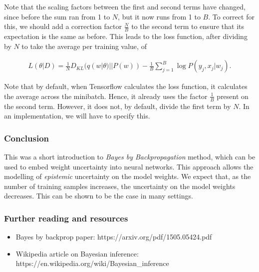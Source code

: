 \documentclass[11pt]{article}
\providecommand{\tightlist}{%
      \setlength{\itemsep}{0pt}\setlength{\parskip}{0pt}}
\begin{document}
Note that the scaling factors between the first and second terms have
changed, since before the sum ran from 1 to \(N\), but it now runs from
1 to \(B\). To correct for this, we should add a correction factor
\(\frac{N}{B}\) to the second term to ensure that its expectation is the
same as before. This leads to the loss function, after dividing by \(N\)
to take the average per training value, of

\[
\begin{align}
L(\theta | D) = \frac{1}{N} D_{KL} ( q(w | \theta) || P(w) ) - \frac{1}{B} \sum_{j=1}^{B} \log P(y_j, x_j | w_j).
\end{align}
\]

Note that by default, when Tensorflow calculates the loss function, it
calculates the average across the minibatch. Hence, it already uses the
factor \(\frac{1}{B}\) present on the second term. However, it does not,
by default, divide the first term by \(N\). In an implementation, we
will have to specify this.

    \hypertarget{conclusion}{%
\subsubsection{Conclusion}\label{conclusion}}

This was a short introduction to \emph{Bayes by Backpropagation} method,
which can be used to embed weight uncertainty into neural networks. This
approach allows the modelling of \emph{epistemic} uncertainty on the
model weights. We expect that, as the number of training samples
increases, the uncertainty on the model weights decreases. This can be
shown to be the case in many settings.

    \hypertarget{further-reading-and-resources}{%
\subsubsection{Further reading and
resources}\label{further-reading-and-resources}}

\begin{itemize}
\tightlist
\item
  Bayes by backprop paper: https://arxiv.org/pdf/1505.05424.pdf
\item
  Wikipedia article on Bayesian inference:
  https://en.wikipedia.org/wiki/Bayesian\_inference
\end{itemize}


    
    
    
\end{document}
